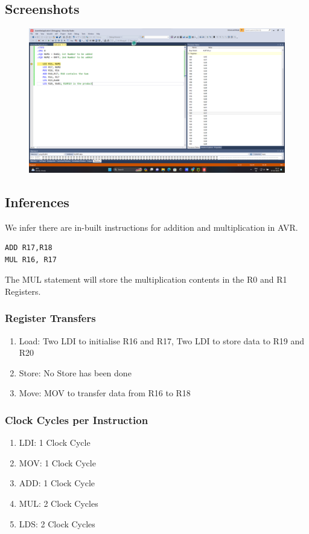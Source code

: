 \documentclass[titlepage, 11pt]{article}
\begin{document}
\subsection{Screenshots}

\begin{figure}[H]
  \centering
  \includegraphics[width=1\linewidth]{prob1.png}
\end{figure}

\subsection{Inferences}
We infer there are in-built instructions for addition and multiplication in AVR.
\begin{verbatim}
ADD R17,R18
MUL R16, R17
\end{verbatim}

The MUL statement will store the multiplication contents in the R0 and R1 Registers.

\subsubsection{Register Transfers}
\begin{enumerate}
\item Load: Two LDI to initialise R16 and R17, Two LDI to store data to R19 and R20
\item Store: No Store has been done
\item Move: MOV to transfer data from R16 to R18
\end{enumerate}

\subsubsection{Clock Cycles per Instruction}
\begin{enumerate}
\item LDI: 1 Clock Cycle
\item MOV: 1 Clock Cycle
\item ADD: 1 Clock Cycle
\item MUL: 2 Clock Cycles
\item LDS: 2 Clock Cycles
\end{enumerate}
\end{document}

